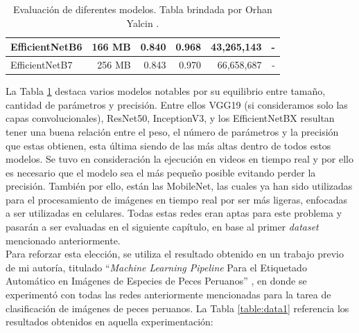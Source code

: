 \begin{table}[h!]
\begin{tabular}{|l|r|r|r|r|r|}
    EfficientNetB6                                               & 166 MB                             & 0.840                                                                                   & 0.968                                                                                   & 43,265,143                               & -                                   \\ \hline
    EfficientNetB7                                               & 256 MB                             & 0.843                                                                                   & 0.970                                                                                   & 66,658,687                               & -                                   \\ \hline
    \end{tabular}
    \caption[Evaluación de diferentes modelos. Tabla brindada por Orhan Yalcin.]
    {Evaluación de diferentes modelos. Tabla brindada por Orhan Yalcin \protect\cite{DataModelos}.}
    \label{evaluacion}
\end{table}

La Tabla \ref{evaluacion} destaca varios modelos notables por su equilibrio entre 
tamaño, cantidad de parámetros y precisión. Entre ellos VGG19 
(si consideramos solo las capas convolucionales), ResNet50, InceptionV3, 
y los EfficientNetBX resultan tener una buena relación entre el peso, el 
número de parámetros y la precisión que estas obtienen, esta última 
siendo de las más altas dentro de todos estos modelos. Se tuvo en 
consideración la ejecución en videos en tiempo real y por ello es necesario 
que el modelo sea el más pequeño posible evitando perder la precisión. También 
por ello, están las MobileNet, las cuales ya han sido utilizadas para el 
procesamiento de imágenes en tiempo real por ser más ligeras, enfocadas a 
ser utilizadas en celulares. Todas estas redes eran aptas para 
este problema y pasarán a ser evaluadas en el siguiente capítulo, en base 
al primer \textit{dataset} mencionado anteriormente. \\

Para reforzar esta elección, se utiliza el resultado obtenido en un trabajo previo 
de mi autoría, titulado ``\textit{Machine Learning Pipeline} Para el 
Etiquetado Automático en Imágenes de Especies de Peces Peruanos''
\cite{Madera2024}, en donde se experimentó con todas las 
redes anteriormente mencionadas para la tarea de clasificación de imágenes 
de peces peruanos. La Tabla \ref{table:data1} referencia los resultados 
obtenidos en aquella experimentación:

